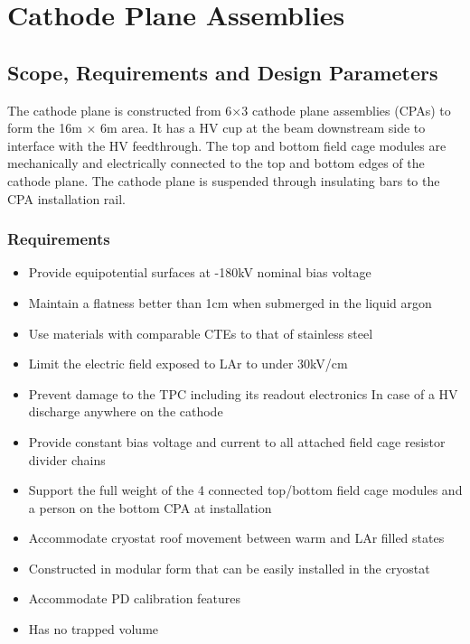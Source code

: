 


\section{Cathode Plane Assemblies}


\subsection{Scope, Requirements and Design Parameters}

The cathode plane is constructed from 6$\times$3 cathode plane assemblies (CPAs) to form the 16m $\times$ 6m area.  It has a HV cup at the beam downstream side to interface with the HV feedthrough. The top and bottom field cage modules are mechanically and electrically connected to the top and bottom edges of the cathode plane.  The cathode plane is suspended through insulating bars to the CPA installation rail.

\subsubsection{Requirements}

\begin{itemize}
\item Provide equipotential surfaces at -180kV nominal bias voltage
\item Maintain a flatness better than 1cm when submerged in the liquid argon
\item Use materials with comparable CTEs to that of stainless steel 
\item Limit the electric field exposed to LAr to under 30kV/cm
\item Prevent damage to the TPC including its readout electronics In case of a HV discharge anywhere on the cathode
\item Provide constant bias voltage and current to all attached field cage resistor divider chains
\item Support the full weight of the 4 connected top/bottom field cage modules and a person on the bottom CPA at installation
\item Accommodate cryostat roof movement between warm and LAr filled states
\item Constructed in modular form that can be easily installed in the cryostat
\item Accommodate PD calibration features
\item Has no trapped volume

\end{itemize}

